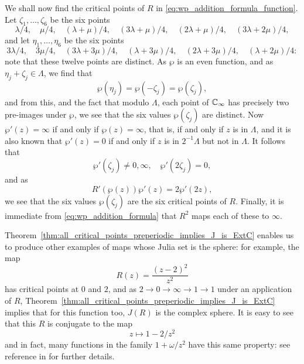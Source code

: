\begin{example*}[Continuation]
    We shall now find the critical points of $R$ in
    \eqref{eq:wp_addition_formula_function}. Let $\zeta_1, \dots, \zeta_6$ be
    the six points
    \begin{equation*}
        \lambda/4, \quad \mu/4, \quad (\lambda + \mu)/4, \quad (3\lambda + \mu)/4, \quad (2\lambda + \mu)/4, \quad (3\lambda + 2\mu)/4,
    \end{equation*}
    and let $\eta_1, \dots, \eta_6$ be the six points
    \begin{equation*}
        3\lambda/4, \quad 3\mu/4, \quad (3\lambda + 3\mu)/4, \quad (\lambda + 3\mu)/4, \quad (2\lambda + 3\mu)/4, \quad (\lambda + 2\mu)/4:
    \end{equation*}
    note that these twelve points are distinct. As $\wp$ is an even function,
    and as $\eta_j + \zeta_j \in \Lambda$, we find that
    \begin{equation*}
        \wp(\eta_j) = \wp(-\zeta_j) = \wp(\zeta_j),
    \end{equation*}
    and from this, and the fact that modulo $\Lambda$, each point of $\mathbb{C}_\infty$ has
    precisely two pre-images under $\wp$, we see that the six values
    $\wp(\zeta_j)$ are distinct. Now $\wp'(z) = \infty$ if and only if $\wp(z) =
    \infty$, that is, if and only if $z$ is in $\Lambda$, and it is also known
    that $\wp'(z) = 0$ if and only if $z$ is in $2^{-1}\Lambda$ but not in
    $\Lambda$. It follows that
    \begin{equation*}
        \wp'(\zeta_j) \neq 0, \infty, \quad \wp'(2\zeta_j) = 0,
    \end{equation*}
    and as
    \begin{equation*}
        R'(\wp(z))\wp'(z) = 2\wp'(2z),
    \end{equation*}
    we see that the six values $\wp(\zeta_j)$ are the six critical points of
    $R$. Finally, it is immediate from \eqref{eq:wp_addition_formula} that $R^2$
    maps each of these to $\infty$.
\end{example*}

\begin{example}
    Theorem~\ref{thm:all_critical_points_preperiodic_implies_J_is_ExtC} enables
    us to produce other examples of maps whose Julia set is the sphere: for
    example, the map
    \begin{equation*}
        R(z) = \frac{(z - 2)^2}{z^2}
    \end{equation*}
    has critical points at $0$ and $2$, and as $2 \to 0 \to \infty \to 1 \to 1$
    under an application of $R$,
    Theorem~\ref{thm:all_critical_points_preperiodic_implies_J_is_ExtC} implies
    that for this function too, $J(R)$ is the complex sphere. It is easy to see
    that this $R$ is conjugate to the map
    \begin{equation*}
        z \mapsto 1 - 2/z^2
    \end{equation*}
    and in fact, many functions in the family $1 + \omega/z^2$ have this same
    property: see reference in \cite[76]{Beardon1991} for further details.
\end{example}

